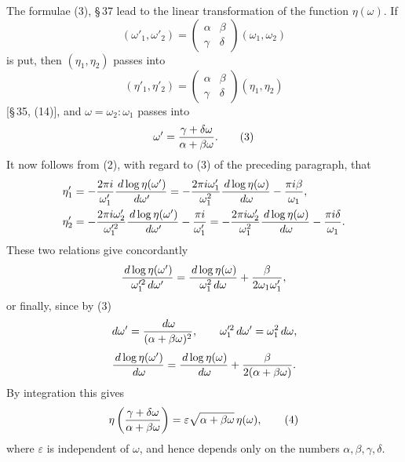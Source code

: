 \documentclass[11pt]{article}
\providecommand{\dd}{\,d}
\begin{document}
The formulae (3), \S\,37 lead to the linear transformation of the function $\eta(\omega)$. If
\begin{equation}
(\omega'_1,\omega'_2)=
\begin{pmatrix}\alpha&\beta\\ \gamma&\delta\end{pmatrix}(\omega_1,\omega_2)
\tag{1}
\end{equation}
is put, then $(\eta_1,\eta_2)$ passes into
\begin{equation}
(\eta'_1,\eta'_2)=
\begin{pmatrix}\alpha&\beta\\ \gamma&\delta\end{pmatrix}(\eta_1,\eta_2)
\tag{2}
\end{equation}
[\S\,35, (14)], and $\omega=\omega_2:\omega_1$ passes into
\begin{equation}
\omega'={\gamma+\delta\omega\over \alpha+\beta\omega}.
\tag{3}
\end{equation}
It now follows from (2), with regard to (3) of the preceding paragraph, that
\begin{align*}
\eta'_1&=-{2\pi i\over \omega'_1}{\dd\log\eta(\omega')\over\dd\omega'}
=-{2\pi i\omega'_1\over\omega_1^2}{\dd\log\eta(\omega)\over\dd\omega}-{\pi i\beta\over\omega_1},\\
\eta'_2&=-{2\pi i\omega'_2\over \omega_1'^2}{\dd\log\eta(\omega')\over\dd\omega'}-{\pi i\over\omega'_1}
=-{2\pi i\omega'_2\over\omega_1^2}{\dd\log\eta(\omega)\over\dd\omega}-{\pi i\delta\over\omega_1}.
\end{align*}
These two relations give concordantly
\[
 {\dd\log\eta(\omega')\over \omega_1'^2\dd\omega'}
 = {\dd\log\eta(\omega)\over\omega_1^2\dd\omega}
 +{\beta\over2\omega_1\omega_1'},
\]
or finally, since by (3)
\[
\dd\omega'={\dd\omega\over(\alpha+\beta\omega)^2},
\qquad \omega_1'^2\dd\omega'=\omega_1^2\dd\omega,
\]
\[
{\dd\log\eta(\omega')\over\dd\omega}
={\dd\log\eta(\omega)\over\dd\omega}+{\beta\over2(\alpha+\beta\omega)}.
\]
By integration this gives
\begin{equation}
\eta\left({\gamma+\delta\omega\over\alpha+\beta\omega}\right)
=\varepsilon\sqrt{\alpha+\beta\omega}\,\eta(\omega),
\tag{4}
\end{equation}
where $\varepsilon$ is independent of $\omega$, and hence depends only on the numbers $\alpha,\beta,\gamma,\delta$.
\end{document}
